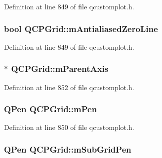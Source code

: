 Definition at line 849 of file qcustomplot.\-h.

\hypertarget{class_q_c_p_grid_a8c0df56ae86440408c050895dcdb922b}{
\subsubsection[{m\-Antialiased\-Zero\-Line}]{\setlength{\rightskip}{0pt plus 5cm}bool Q\-C\-P\-Grid\-::m\-Antialiased\-Zero\-Line\hspace{0.3cm}{\ttfamily [protected]}}}\label{class_q_c_p_grid_a8c0df56ae86440408c050895dcdb922b}


Definition at line 849 of file qcustomplot.\-h.

\hypertarget{class_q_c_p_grid_a9a8a76731e6e737b65b929fd1995cc88}{
\subsubsection[{m\-Parent\-Axis}]{$\ast$ Q\-C\-P\-Grid\-::m\-Parent\-Axis\hspace{0.3cm}{\ttfamily [protected]}}}\label{class_q_c_p_grid_a9a8a76731e6e737b65b929fd1995cc88}


Definition at line 852 of file qcustomplot.\-h.

\hypertarget{class_q_c_p_grid_a1cdc4a3bccf6a40c2d4360def9fefa40}{
\subsubsection[{m\-Pen}]{\setlength{\rightskip}{0pt plus 5cm}Q\-Pen Q\-C\-P\-Grid\-::m\-Pen\hspace{0.3cm}{\ttfamily [protected]}}}\label{class_q_c_p_grid_a1cdc4a3bccf6a40c2d4360def9fefa40}


Definition at line 850 of file qcustomplot.\-h.

\hypertarget{class_q_c_p_grid_aa9004bc139ad3ea92629f0aaae81d83f}{
\subsubsection[{m\-Sub\-Grid\-Pen}]{\setlength{\rightskip}{0pt plus 5cm}Q\-Pen Q\-C\-P\-Grid\-::m\-Sub\-Grid\-Pen\hspace{0.3cm}{\ttfamily [protected]}}}\label{class_q_c_p_grid_aa9004bc139ad3ea92629f0aaae81d83f}


